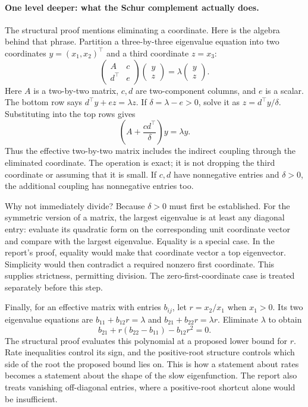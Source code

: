 \documentclass[11pt]{article}
\begin{document}
\paragraph{One level deeper: what the Schur complement actually does.}
The structural proof mentions eliminating a coordinate. Here is the algebra
behind that phrase. Partition a three-by-three eigenvalue equation into
two coordinates $y=(x_1,x_2)^\top$ and a third coordinate $z=x_3$:
\[
\begin{pmatrix}A&c\\d^\top&e\end{pmatrix}
\begin{pmatrix}y\\z\end{pmatrix}
=\lambda\begin{pmatrix}y\\z\end{pmatrix}.
\]
Here $A$ is a two-by-two matrix, $c,d$ are two-component columns, and $e$
is a scalar. The bottom row says $d^\top y+ez=\lambda z$.
If $\delta=\lambda-e>0$, solve it as $z=d^\top y/\delta$.
Substituting into the top rows gives
\[
\left(A+\frac{cd^\top}{\delta}\right)y=\lambda y.
\]
Thus the effective two-by-two matrix includes the indirect coupling through
the eliminated coordinate. The operation is exact; it is not dropping the
third coordinate or assuming that it is small. If $c,d$ have nonnegative
entries and $\delta>0$, the additional coupling has nonnegative entries too.

Why not immediately divide? Because $\delta>0$ must first be established.
For the symmetric version of a matrix, the largest eigenvalue is at least
any diagonal entry: evaluate its quadratic form on the corresponding unit
coordinate vector and compare with the largest eigenvalue. Equality is a
special case. In the report's proof, equality would make that coordinate
vector a top eigenvector. Simplicity would then contradict a required
nonzero first coordinate. This supplies strictness, permitting division.
The zero-first-coordinate case is treated separately before this step.

Finally, for an effective matrix with entries $b_{ij}$, let
$r=x_2/x_1$ when $x_1>0$. Its two eigenvalue equations are
$b_{11}+b_{12}r=\lambda$ and $b_{21}+b_{22}r=\lambda r$.
Eliminate $\lambda$ to obtain
\[
b_{21}+r(b_{22}-b_{11})-b_{12}r^2=0.
\]
The structural proof evaluates this polynomial at a proposed lower bound
for $r$. Rate inequalities control its sign, and the positive-root
structure controls which side of the root the proposed bound lies on.
This is how a statement about rates becomes a statement about the shape
of the slow eigenfunction. The report also treats vanishing off-diagonal
entries, where a positive-root shortcut alone would be insufficient.
\end{document}
